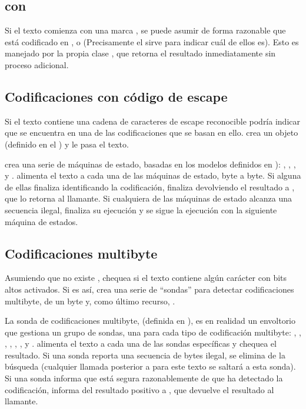 \subsection{ con }

Si el texto comienza con una marca , se puede asumir de forma razonable que está codificado en ,  o  (Precisamente el  sirve para indicar cuál de ellos es). Esto es manejado por la propia clase , que retorna el resultado inmediatamente sin proceso adicional.

\subsection{Codificaciones con código de escape}

Si el texto contiene una cadena de caracteres de escape reconocible podría indicar que se encuentra en una de las codificaciones que se basan en ello.  crea un objeto  (definido en el ) y le pasa el texto.

 crea una serie de máquinas de estado, basadas en los modelos definidos en ): , , , y .  alimenta el texto a cada una de las máquinas de estado, byte a byte. Si alguna de ellas finaliza identificando la codificación,  finaliza devolviendo el resultado a , que lo retorna al llamante. Si cualquiera de las máquinas de estado alcanza una secuencia ilegal, finaliza su ejecución y se sigue la ejecución con la siguiente máquina de estados.

\subsection{Codificaciones multibyte}

Asumiendo que no existe ,  chequea si el texto contiene algún carácter con bits altos activados. Si es así, crea una serie de ``sondas'' para detectar codificaciones multibyte, de un byte y, como último recurso, .

La sonda de codificaciones multibyte,  (definida en ), es en realidad un envoltorio que gestiona un grupo de sondas, una para cada tipo de codificación multibyte: , , , , , , y .  alimenta el texto a cada una de las sondas específicas y chequea el resultado. Si una sonda reporta una secuencia de bytes ilegal, se elimina de la búsqueda (cualquier llamada posterior a  para este texto se saltará a esta sonda). Si una sonda informa que está segura razonablemente de que ha detectado la codificación,  informa del resultado positivo a , que devuelve el resultado al llamante.

